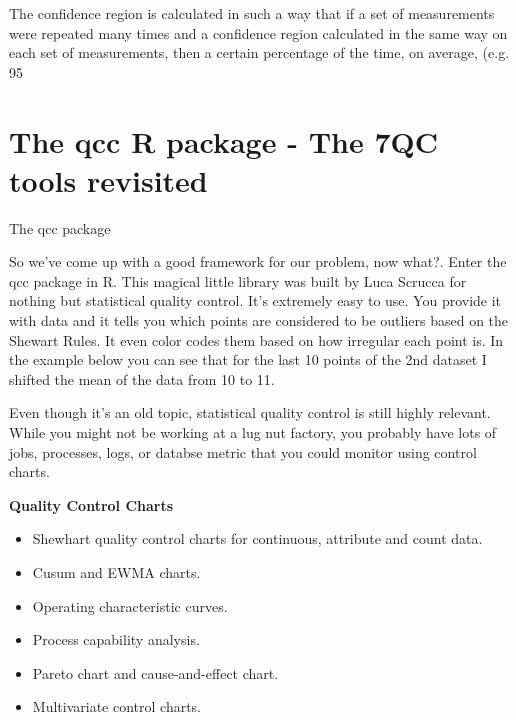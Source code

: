\documentclass[]{article}
\begin{document}
The confidence region is calculated in such a way that if a set of measurements were repeated many times and a confidence region calculated in the same way on each set of measurements, then a certain percentage of the time, on average, (e.g. 95%
\newpage

\section{The \textbf{qcc} R package - The 7QC tools revisited}
The qcc package


So we've come up with a good framework for our problem, now what?. Enter the qcc package in R. This magical little library was built by Luca Scrucca for nothing but statistical quality control. It's extremely easy to use. You provide it with data and it tells you which points are considered to be outliers based on the Shewart Rules. It even color codes them based on how irregular each point is. In the example below you can see that for the last 10 points of the 2nd dataset I shifted the mean of the data from 10 to 11.

Even though it's an old topic, statistical quality control is still highly relevant. While you might not be working at a lug nut factory, you probably have lots of jobs, processes, logs, or databse metric that you could monitor using control charts.

\textbf{Quality Control Charts}

\begin{itemize}
\item Shewhart quality control charts for continuous, attribute and count data.
\item Cusum and EWMA charts. 
\item Operating characteristic curves.
\item Process capability analysis. 
\item Pareto chart and cause-and-effect chart. 
\item Multivariate control charts.
\end{itemize}
\end{document}
